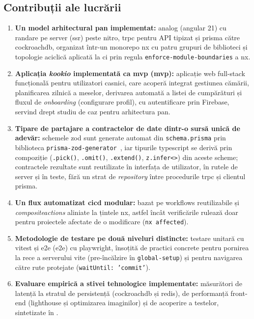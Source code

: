 \subsection{Contribuții ale lucrării}\label{sec:contributii}
\begin{enumerate}
  \item \textbf{Un model arhitectural \gls{pan} implementat:} \gls{analog} (\gls{angular} 21) cu randare pe server (\acrshort{ssr}) peste \gls{nitro}, \acrshort{trpc} pentru API tipizat și \gls{prisma} către \gls{cockroachdb}, organizat într-un \gls{monorepo} \gls{nx} cu patru grupuri de biblioteci și topologie aciclică aplicată la \acrshort{ci} prin regula \texttt{enforce-module-boundaries} a \gls{nx}.
  \item \textbf{Aplicația \textit{\gls{kookio}} implementată ca \acrlong{mvp} (\acrshort{mvp}):} aplicație \gls{web} full-stack funcțională pentru utilizatori casnici, care acoperă integrat gestiunea cămării, planificarea zilnică a meselor, derivarea automată a listei de cumpărături și fluxul de \textit{onboarding} (configurare profil), cu autentificare prin Firebase, servind drept studiu de caz pentru arhitectura \gls{pan}.
  \item \textbf{Tipare de partajare a contractelor de date dintr-o sursă unică de adevăr:} schemele \gls{zod} sunt generate automat din \texttt{schema.prisma} prin biblioteca \texttt{prisma-zod-generator}~\cite{prisma_zod_generator}, iar tipurile \gls{typescript} se derivă prin compoziție (\texttt{.pick()}, \texttt{.omit()}, \texttt{.extend()}, \texttt{z.infer<>}) din aceste scheme; contractele rezultate sunt reutilizate în interfața de utilizator, în rutele de server și în teste, fără un strat de \textit{repository} între procedurile \acrshort{trpc} și clientul \gls{prisma}.
  \item \textbf{Un flux automatizat \gls{cicd} modular:} bazat pe \glspl{workflow} reutilizabile și \textit{\glspl{compositeaction}} aliniate la țintele \gls{nx}, astfel încât verificările rulează doar pentru proiectele afectate de o modificare (\texttt{nx affected}).
  \item \textbf{Metodologie de testare pe două niveluri distincte:} testare unitară cu \gls{vitest} și \acrlong{e2e} (\acrshort{e2e}) cu \gls{playwright}, însoțită de practici concrete pentru pornirea la rece a serverului \gls{vite} (pre-încălzire în \texttt{global-setup}) și pentru navigarea către rute protejate (\texttt{waitUntil: 'commit'}).
  \item \textbf{Evaluare empirică a stivei tehnologice implementate:} măsurători de latență la stratul de persistență (\gls{cockroachdb} și \gls{redis}), de performanță front-end (\gls{lighthouse} și optimizarea imaginilor) și de acoperire a testelor, sintetizate în .
\end{enumerate}

